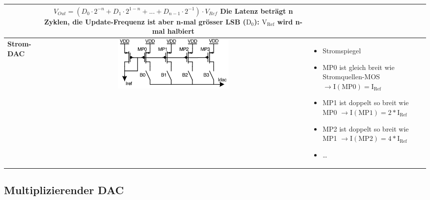 \begin{longtable}{|>{\bfseries}p{4cm}|c|p{8cm}|}
	& $V_{Out} = (D_0 \cdot 2^{-n} + D_1 \cdot 2^{1-n} + ... + D_{n-1} \cdot 2^{-1})\cdot V_{Ref}$\newline\newline
      Die Latenz beträgt n Zyklen, die Update-Frequenz ist aber n-mal grösser\newline
      LSB ($\mathrm{D_0}$): $\mathrm{V_{Ref}}$ wird n-mal halbiert
	\\ \hline
	Strom-DAC
	& \includegraphics[width=6cm, valign=t]{pictures/stromDAC}
	& \begin{itemize}
  		\item Stromspiegel
  		\item MP0 ist gleich breit wie Stromquellen-MOS $\to \mathrm{I(MP0)=I_{Ref}}$
  		\item MP1 ist doppelt so breit wie MP0 $\to \mathrm{I(MP1)}=2*\mathrm{I_{Ref}}$
  		\item MP2 ist doppelt so breit wie MP1 $\to \mathrm{I(MP2)}=4*\mathrm{I_{Ref}}$
  		\item \ldots
	  \end{itemize}
	\\ \hline
\end{longtable}


\subsection{Multiplizierender DAC} 

